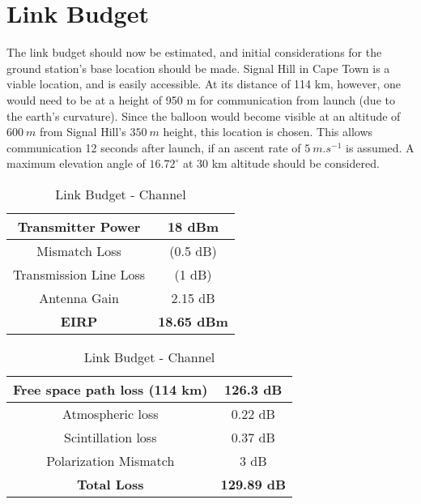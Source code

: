 \section{Link Budget}

The link budget should now be estimated, and initial considerations for the ground station's base location should be made. Signal Hill in Cape Town is a viable location, and is easily accessible. At its distance of 114 km, however, one would need to be at a height of 950 m for communication from launch (due to the earth's curvature). Since the balloon would become visible at an altitude of $\SI{600}{m}$ from Signal Hill's $\SI{350}{m}$ height, this location is chosen. This allows communication 12 seconds after launch, if an ascent rate of $\SI{5}{m.s^{-1}}$ is assumed. A maximum elevation angle of $16.72^\circ$ at 30 km altitude should be considered.

\begin{table}[!htb]
  \begin{minipage}{.49\textwidth}
      \centering
      \renewcommand{\arraystretch}{1.2}
      \begin{tabular}{ |c|c| }
      \hline
      Transmitter Power             & 18 dBm                    \\ \hline
      Mismatch Loss                 & (0.5 dB)                 \\ \hline
      Transmission Line Loss        & (1 dB)                  \\ \hline
      Antenna Gain                  & 2.15 dB                   \\ \hline
      \textbf{EIRP}                 & \textbf{18.65 dBm}        \\ \hline
      \end{tabular}
      \caption{Link Budget - Satellite}
      \label{tab:link_budget_satellite}
  \end{minipage}
  \begin{minipage}{.49\textwidth}
      \centering
      \renewcommand{\arraystretch}{1.2}
      \begin{tabular}{ |c|c| }
      \hline
      Free space path loss (114 km) & 126.3 dB                  \\ \hline
      Atmospheric loss              & 0.22 dB                   \\ \hline
      Scintillation loss            & 0.37 dB                   \\ \hline
      Polarization Mismatch         & 3 dB                      \\ \hline
      \textbf{Total Loss}           & \textbf{129.89 dB}         \\ \hline
      \end{tabular}
      \caption{Link Budget - Channel}
      \label{tab:link_budget_channel}
  \end{minipage}
\end{table}

